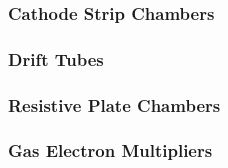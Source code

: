 \subsubsection{Cathode Strip Chambers} \label{sec:CSC}


\subsubsection{Drift Tubes} \label{sec:DT}


\subsubsection{Resistive Plate Chambers} \label{sec:RPC}


\subsubsection{Gas Electron Multipliers} \label{sec:GEM}
 